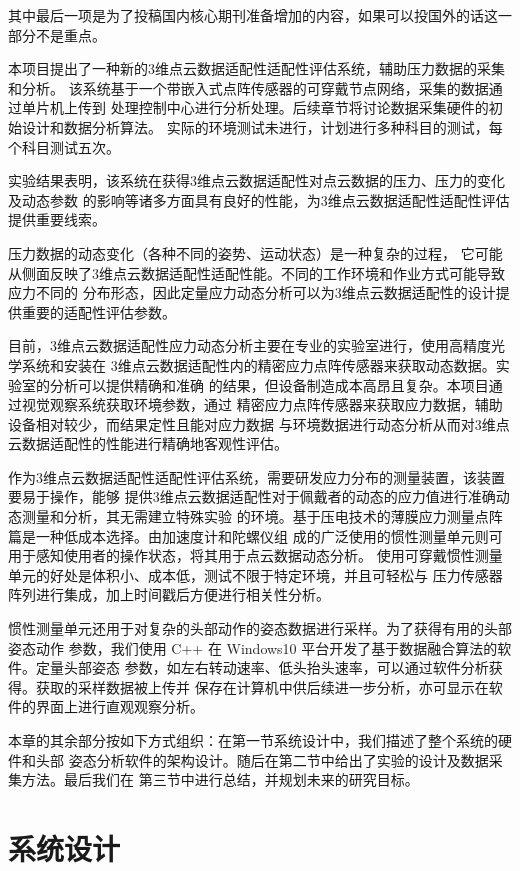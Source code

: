\documentclass[a4paper,12pt]{ctexbook}	%
\begin{document}
其中最后一项是为了投稿国内核心期刊准备增加的内容，如果可以投国外的话这一部分不是重点。


{\kaishu 本项目提出了一种新的3维点云数据适配性适配性评估系统，辅助压力数据的采集和分析。
该系统基于一个带嵌入式点阵传感器的可穿戴节点网络，采集的数据通过单片机上传到
处理控制中心进行分析处理。后续章节将讨论数据采集硬件的初始设计和数据分析算法。
实际的环境测试未进行，计划进行多种科目的测试，每个科目测试五次。}

{\songti 实验结果表明，该系统在获得3维点云数据适配性对点云数据的压力、压力的变化及动态参数
的影响等诸多方面具有良好的性能，为3维点云数据适配性适配性评估提供重要线索。}

{\fangsong 压力数据的动态变化（各种不同的姿势、运动状态）是一种复杂的过程，
它可能从侧面反映了3维点云数据适配性适配性能。不同的工作环境和作业方式可能导致应力不同的
分布形态，因此定量应力动态分析可以为3维点云数据适配性的设计提供重要的适配性评估参数。}

{\songti 
目前，3维点云数据适配性应力动态分析主要在专业的实验室进行，使用高精度光学系统和安装在
3维点云数据适配性内的精密应力点阵传感器来获取动态数据。实验室的分析可以提供精确和准确
的结果，但设备制造成本高昂且复杂。本项目通过视觉观察系统获取环境参数，通过
精密应力点阵传感器来获取应力数据，辅助设备相对较少，而结果定性且能对应力数据
与环境数据进行动态分析从而对3维点云数据适配性的性能进行精确地客观性评估。

作为3维点云数据适配性适配性评估系统，需要研发应力分布的测量装置，该装置要易于操作，能够
提供3维点云数据适配性对于佩戴者的动态的应力值进行准确动态测量和分析，其无需建立特殊实验
的环境。基于压电技术的薄膜应力测量点阵篇是一种低成本选择。由加速度计和陀螺仪组
成的广泛使用的惯性测量单元则可用于感知使用者的操作状态，将其用于点云数据动态分析。
使用可穿戴惯性测量单元的好处是体积小、成本低，测试不限于特定环境，并且可轻松与
压力传感器阵列进行集成，加上时间戳后方便进行相关性分析。

惯性测量单元还用于对复杂的头部动作的姿态数据进行采样。为了获得有用的头部姿态动作
参数，我们使用 C++ 在 Windows10 平台开发了基于数据融合算法的软件。定量头部姿态
参数，如左右转动速率、低头抬头速率，可以通过软件分析获得。获取的采样数据被上传并
保存在计算机中供后续进一步分析，亦可显示在软件的界面上进行直观观察分析。

本章的其余部分按如下方式组织：在第一节系统设计中，我们描述了整个系统的硬件和头部
姿态分析软件的架构设计。随后在第二节中给出了实验的设计及数据采集方法。最后我们在
第三节中进行总结，并规划未来的研究目标。
}

\section{系统设计}
\end{document}
